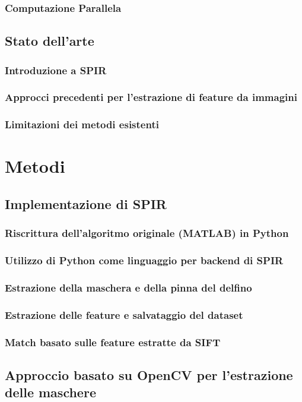 \documentclass[a4paper,12pt]{report}
\begin{document}
\subsection{Computazione Parallela}
\section{Stato dell'arte}
\subsection{Introduzione a SPIR}
\subsection{Approcci precedenti per l'estrazione di feature da immagini}
\subsection{Limitazioni dei metodi esistenti}

\chapter{Metodi}
\section{Implementazione di SPIR}
\subsection{Riscrittura dell'algoritmo originale (MATLAB) in Python}
\subsection{Utilizzo di Python come linguaggio per backend di SPIR}
\subsection{Estrazione della maschera e della pinna del delfino}
\subsection{Estrazione delle feature e salvataggio del dataset}
\subsection{Match basato sulle feature estratte da SIFT}
\section{Approccio basato su OpenCV per l'estrazione delle maschere}
\end{document}
